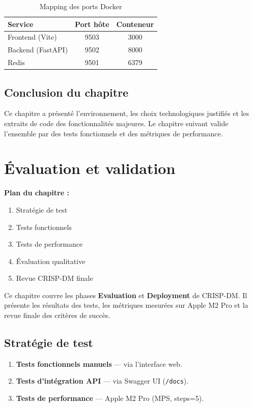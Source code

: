\documentclass[12pt,a4paper,oneside]{report}
\newcommand{\theadrow}{\rowcolor{tekupblue!12}}
\newcommand{\chapterintro}[2]{%
  \begin{tcolorbox}[colback=tekupblue!4,colframe=tekupblue!40,
    boxrule=0.6pt,arc=4pt,left=10pt,right=10pt,top=6pt,bottom=6pt]
  \small\textbf{Plan du chapitre :}\\[3pt]#1
  \end{tcolorbox}
  \vspace{6pt}\noindent #2\vspace{10pt}
}
\begin{document}
\begin{table}[H]
\centering
\caption{Mapping des ports Docker}
\label{tab:ports}
\begin{tabular}{@{}lcc@{}}
\toprule
\theadrow
\textbf{Service} & \textbf{Port hôte} & \textbf{Conteneur} \\\midrule
Frontend (Vite)   & 9503 & 3000 \\
Backend (FastAPI) & 9502 & 8000 \\
Redis             & 9501 & 6379 \\
\bottomrule
\end{tabular}
\end{table}

\section*{Conclusion du chapitre}

Ce chapitre a présenté l'environnement, les choix technologiques justifiés
et les extraits de code des fonctionnalités majeures. Le chapitre suivant
valide l'ensemble par des tests fonctionnels et des métriques de performance.

\chapter{Évaluation et validation}

\chapterintro{%
  \begin{enumerate}[noitemsep,leftmargin=*]
    \item Stratégie de test
    \item Tests fonctionnels
    \item Tests de performance
    \item Évaluation qualitative
    \item Revue CRISP-DM finale
  \end{enumerate}
}{%
  Ce chapitre couvre les phases \textbf{Evaluation} et \textbf{Deployment}
  de CRISP-DM. Il présente les résultats des tests, les métriques mesurées
  sur Apple M2 Pro et la revue finale des critères de succès.
}

\section{Stratégie de test}
\begin{enumerate}
  \item \textbf{Tests fonctionnels manuels} --- via l'interface web.
  \item \textbf{Tests d'intégration API} --- via Swagger UI (\texttt{/docs}).
  \item \textbf{Tests de performance} --- Apple M2 Pro (MPS, steps=5).
\end{enumerate}
\end{document}
